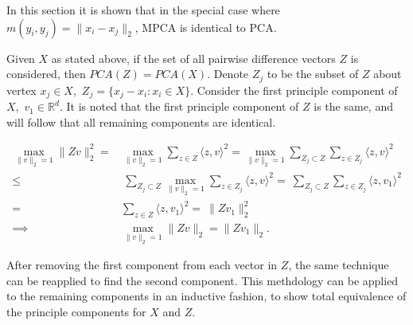 \documentclass{scspaperproc}
\theoremstyle{scsthe}
\begin{document}
In this section it is shown that in the special case where $m(y_i,y_j)
= \|x_i - x_j\|_2$, MPCA is identical to PCA.

Given $X$ as stated above, if the set of all pairwise difference
vectors $Z$ is considered, then $PCA(Z) = PCA(X).$ Denote $Z_j$ to be
the subset of $Z$ about vertex $x_j \in X,$ $Z_j = \{x_j - x_i : x_i
\in X\}.$ Consider the first principle component of $X,$ $v_1 \in
\mathbb{R}^d.$ It is noted that the first principle component of $Z$
is the same, and will follow that all remaining components are
identical.

\begin{align*}
  \max_{\|v\|_2 = 1} \|Zv\|_2^2
  =& \max_{\|v\|_2 = 1} \sum_{z \in Z} \langle z, v \rangle^2
  = \max_{\|v\|_2 = 1} \sum_{Z_j \subset Z} \sum_{z \in Z_j} \langle z, v \rangle^2 \\
  \leq&\ \sum_{Z_j \subset Z} \max_{\|v\|_2 = 1} \sum_{z \in Z_j} \langle z, v \rangle^2 
  = \ \sum_{Z_j \subset Z} \sum_{z \in Z_j} \langle z, v_1 \rangle^2 \\
  =& \sum_{z \in Z} \langle z, v_1 \rangle^2 
  = \ \|Zv_1\|_2^2 \\
  \implies&\max_{\|v\|_2 = 1} \|Zv\|_2 = \|Zv_1\|_2.
\end{align*}

After removing the first component from each vector in $Z$, the same
technique can be reapplied to find the second component. This
methdology can be applied to the remaining components in an inductive
fashion, to show total equivalence of the principle components for $X$
and $Z.$
\end{document}
